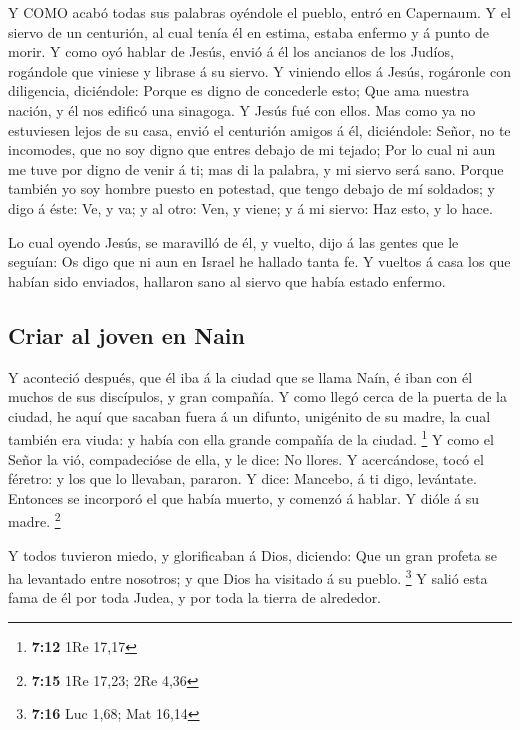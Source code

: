  Y COMO acabó todas sus palabras oyéndole el pueblo, entró
en Capernaum.  Y el siervo de un centurión, al cual tenía él
en estima, estaba enfermo y á punto de morir.  Y como oyó
hablar de Jesús, envió á él los ancianos de los Judíos, rogándole que
viniese y librase á su siervo.  Y viniendo ellos á Jesús,
rogáronle con diligencia, diciéndole: Porque es digno de concederle
esto;  Que ama nuestra nación, y él nos edificó una
sinagoga.  Y Jesús fué con ellos. Mas como ya no estuviesen
lejos de su casa, envió el centurión amigos á él, diciéndole: Señor, no
te incomodes, que no soy digno que entres debajo de mi tejado;
 Por lo cual ni aun me tuve por digno de venir á ti; mas di
la palabra, y mi siervo será sano.  Porque también yo soy
hombre puesto en potestad, que tengo debajo de mí soldados; y digo á
éste: Ve, y va; y al otro: Ven, y viene; y á mi siervo: Haz esto, y lo
hace.

 Lo cual oyendo Jesús, se maravilló de él, y vuelto, dijo á
las gentes que le seguían: Os digo que ni aun en Israel he hallado tanta
fe.  Y vueltos á casa los que habían sido enviados,
hallaron sano al siervo que había estado enfermo.

\hypertarget{criar-al-joven-en-nain}{%
\subsection{Criar al joven en Nain}\label{criar-al-joven-en-nain}}

 Y aconteció después, que él iba á la ciudad que se llama
Naín, é iban con él muchos de sus discípulos, y gran compañía.
 Y como llegó cerca de la puerta de la ciudad, he aquí que
sacaban fuera á un difunto, unigénito de su madre, la cual también era
viuda: y había con ella grande compañía de la ciudad. \footnote{\textbf{7:12}
  1Re 17,17}  Y como el Señor la vió, compadecióse de ella,
y le dice: No llores.  Y acercándose, tocó el féretro: y
los que lo llevaban, pararon. Y dice: Mancebo, á ti digo, levántate.
 Entonces se incorporó el que había muerto, y comenzó á
hablar. Y dióle á su madre. \footnote{\textbf{7:15} 1Re 17,23; 2Re 4,36}

 Y todos tuvieron miedo, y glorificaban á Dios, diciendo:
Que un gran profeta se ha levantado entre nosotros; y que Dios ha
visitado á su pueblo. \footnote{\textbf{7:16} Luc 1,68; Mat 16,14}
 Y salió esta fama de él por toda Judea, y por toda la
tierra de alrededor.

